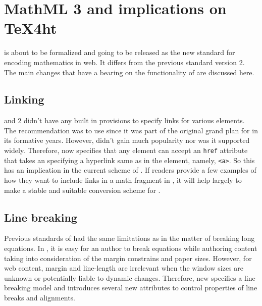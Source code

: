 
\chapter{MathML 3 and implications on TeX4ht}

\leavevmode
{} is about to be formalized and going to be released as the new standard for encoding mathematics in web. It differs from the previous standard version 2. The main changes that have a bearing on the functionality of  are discussed here.

\section{Linking}

 and 2 didn't have any built in provisions to specify links for various elements. The recommendation was to use  since it was part of the original grand plan for  in its formative years. However, \xlink didn't gain much popularity nor was it supported widely. Therefore,  now specifies that any \mathml element can accept an \verb+href+ attribute that takes an \uri specifying a hyperlink same as in the  element, namely, \verb+<a>+. So this has an implication in the current scheme of \texht. If readers provide a few examples of how they want to include links in a math fragment in \latex, it will help largely to make a stable and suitable conversion scheme for \texht.

\section{Line breaking}

Previous standards of \mathml had the same limitations as \tex in the matter of breaking long equations. In \tex, it is easy for an author to break equations while authoring content taking into consideration of the margin constrains and paper sizes. However, for web content, margin and line-length are irrelevant when the window sizes are unknown or potentially liable to dynamic changes. Therefore, new  specifies a line breaking model and introduces several new attributes to control properties of line breaks and alignments. 

